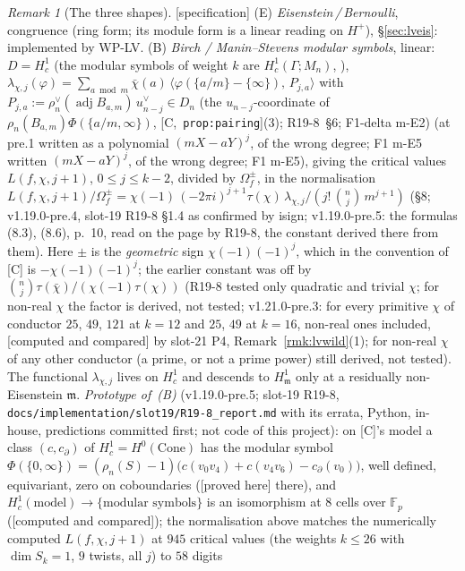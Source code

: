 \documentclass[11pt]{article}
\theoremstyle{remark}
\newtheorem{remark}[theorem]{Remark}
\newcommand{\F}{\mathbb{F}}
\newcommand{\Ga}{\Gamma}
\newcommand{\m}{\mathfrak{m}}
\newcommand{\Mn}{M_n}
\newcommand{\HA}[1]{[C,~\texttt{#1}]}      %
\newcommand{\PROVED}{\textsf{[proved here]}}
\newcommand{\CMPD}{\textsf{[computed and compared]}}   %
\newcommand{\SPEC}{\textsf{[specification]}}           %
\begin{document}
\begin{remark}[The three shapes]\label{rmk:lvshapes}
\SPEC{} (E) \emph{Eisenstein\,/\,Bernoulli}, \textsf{congruence} (ring form; its module form is a \textsf{linear} reading on $H^{+}$), \S\ref{sec:lveis}: implemented by WP-LV. (B) \emph{Birch / Manin--Stevens modular symbols}, linear: $D=H^{1}_c$ (the
modular symbols of weight $k$ are $H^{1}_c(\Ga;\Mn)$, \cite{ash_stevens}), $\lambda_{\chi,j}(\varphi)=\sum_{a\bmod m}\bar\chi(a)\,\langle\varphi(\{a/m\}-\{\infty\}),\,
P_{j,a}\rangle$ with $P_{j,a}:=\rho_n^{\vee}(\operatorname{adj}B_{a,m})\,u^{\vee}_{n-j}\in D_n$ (the $u_{n-j}$-coordinate of $\rho_n(B_{a,m})\Phi(\{a/m,\infty\})$, \HA{prop:pairing}(3); R19-8~\S6; F1-delta m-E2) (at pre.1 written as a polynomial $(mX-aY)^{j}$, of the wrong degree; F1 m-E5 written $(mX-aY)^{j}$, of the wrong degree; F1 m-E5), giving the critical values $L(f,\chi,j+1)$, $0\le j\le k-2$, divided by
$\Omega_f^{\pm}$, in the normalisation $L(f,\chi,j+1)/\Omega_f^{\pm}=\chi(-1)\,(-2\pi i)^{j+1}\tau(\chi)\,\lambda_{\chi,j}/(j!\,\binom{n}{j}\,m^{j+1})$ \cite{mtt} (\S8; v1.19.0-pre.4, slot-19 R19-8 \S1.4 as confirmed by isign; v1.19.0-pre.5: the formulas (8.3), (8.6), p.~10, read on the page by R19-8, the constant derived there from them). Here $\pm$ is the \emph{geometric} sign $\chi(-1)(-1)^{j}$, which in the convention of [C] is $-\chi(-1)(-1)^{j}$; the earlier constant was off by $\binom{n}{j}\tau(\bar\chi)/(\chi(-1)\tau(\chi))$ (R19-8 tested only quadratic and trivial $\chi$; for non-real $\chi$ the factor is derived, not tested; v1.21.0-pre.3: for every primitive $\chi$ of conductor $25$, $49$, $121$ at $k=12$ and $25$, $49$ at $k=16$,
non-real ones included, \CMPD{} by slot-21 P4, Remark~\ref{rmk:lvwild}(1); for non-real $\chi$ of any other conductor (a prime, or not a prime power) still derived, not tested). The functional $\lambda_{\chi,j}$ lives on $H^{1}_c$ and descends to $H^{1}_\m$ only at a residually non-Eisenstein $\m$.
\emph{Prototype of~(B)} (v1.19.0-pre.5; slot-19 R19-8, \texttt{docs/implementation/slot19/R19-8\_report.md} with its errata, Python, in-house, predictions committed first; not
code of this project): on [C]'s model a class $(c,c_\partial)$ of $H^{1}_c=H^{0}(\mathrm{Cone})$ has the modular symbol $\Phi(\{0,\infty\})=(\rho_n(S)-1)\bigl(c(v_0v_4)+c(v_4v_6)-c_\partial(v_0)\bigr)$,
well defined, equivariant, zero on coboundaries (\PROVED{} there), and $H^{1}_c(\text{model})\to\{\text{modular symbols}\}$ is an isomorphism at $8$ cells over $\F_p$ (\CMPD); the
normalisation above matches the numerically computed $L(f,\chi,j+1)$ at $945$ critical values (the weights $k\le26$ with $\dim S_k=1$, $9$ twists, all $j$) to $58$ digits

\end{remark}
\end{document}
